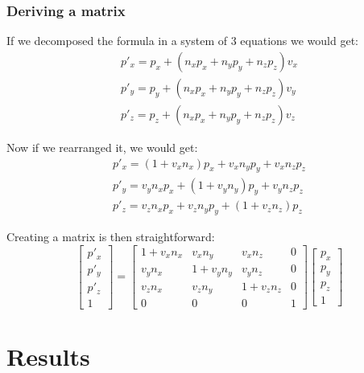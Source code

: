 \documentclass[]{report}   %
\begin{document}
\subsection{Deriving a matrix}

If we decomposed the formula in a system of 3 equations we would get:
\begin{align*}
	p\prime_x = p_x + (n_x p_x + n_y p_y + n_z p_z) v_x	\\
	p\prime_y = p_y + (n_x p_x + n_y p_y + n_z p_z) v_y	\\
	p\prime_z = p_z + (n_x p_x + n_y p_y + n_z p_z) v_z	
\end{align*}

Now if we rearranged it, we would get:
\begin{align*}
	p\prime_x = (1 + v_x n_x) p_x + v_x n_y p_y + v_x n_z p_z	\\
	p\prime_y = v_y n_x p_x + (1 + v_y n_y) p_y + v_y n_z p_z	\\
	p\prime_z = v_z n_x p_x + v_z n_y p_y + (1 + v_z n_z) p_z
\end{align*}

Creating a matrix is then straightforward:
\[
	\begin{bmatrix}
	p\prime_x \\
	p\prime_y \\
	p\prime_z \\
	1
	\end{bmatrix}
	=
	\begin{bmatrix}
	1 + v_x n_x		&	v_x n_y		&	v_x n_z		&	0	\\
	v_y n_x			&	1 + v_y n_y	&	v_y n_z		&	0	\\
	v_z n_x			&	v_z n_y		&	1 + v_z n_z	&	0	\\
		0		&	0		&	0		&	1
	\end{bmatrix}
	\begin{bmatrix}
	p_x \\
	p_y \\
	p_z \\
	1
	\end{bmatrix}	
\]


\chapter{Results}           %
\end{document}
